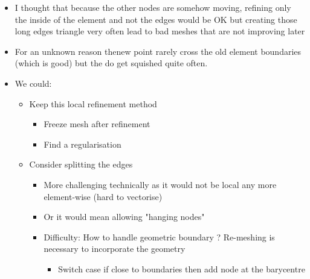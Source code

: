 \begin{itemize}
	\item I thought that because the other nodes are somehow moving, refining only the inside of the element and not the edges would be OK but creating those long edges triangle very often lead to bad meshes that are not improving later
	\item For an unknown reason thenew point rarely cross the old element boundaries (which is good) but the do get squished quite often.
	\item We could:
	\begin{itemize}
		\item Keep this local refinement method
		\begin{itemize}
			\item Freeze mesh after refinement
			\item Find a regularisation
		\end{itemize}
			\item Consider splitting the edges 
				\begin{itemize}
				\item More challenging technically as it would not be local any more element-wise (hard to vectorise)
				\item Or it would mean allowing "hanging nodes"
				\item Difficulty: How to handle geometric boundary ? Re-meshing is necessary to incorporate the geometry
					\begin{itemize}
					\item Switch case if close to boundaries then add node at the barycentre
				\end{itemize}
			\end{itemize}
	\end{itemize}
\end{itemize}


